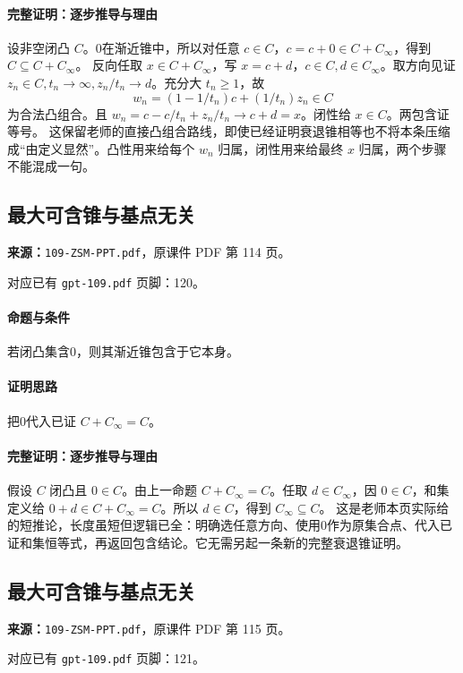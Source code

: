\paragraph{完整证明：逐步推导与理由}

设非空闭凸 $C$。0在渐近锥中，所以对任意 $c\in C$，$c=c+0\in C+C_\infty$，得到 $C\subseteq C+C_\infty$。
反向任取 $x\in C+C_\infty$，写 $x=c+d$，$c\in C,d\in C_\infty$。取方向见证 $z_n\in C,t_n\to\infty,z_n/t_n\to d$。充分大 $t_n\ge1$，故
\[w_n=(1-1/t_n)c+(1/t_n)z_n\in C\]
为合法凸组合。且 $w_n=c-c/t_n+z_n/t_n\to c+d=x$。闭性给 $x\in C$。两包含证等号。
这保留老师的直接凸组合路线，即使已经证明衰退锥相等也不将本条压缩成“由定义显然”。凸性用来给每个 $w_n$ 归属，闭性用来给最终 $x$ 归属，两个步骤不能混成一句。

\clearpage\subsection{最大可含锥与基点无关}
\textbf{来源：}\texttt{109-ZSM-PPT.pdf}，原课件 PDF 第 114 页。\par
对应已有 \texttt{gpt-109.pdf} 页脚：120。\par
\paragraph{命题与条件}若闭凸集含0，则其渐近锥包含于它本身。
\paragraph{证明思路}把0代入已证 $C+C_\infty=C$。
\paragraph{完整证明：逐步推导与理由}

假设 $C$ 闭凸且 $0\in C$。由上一命题 $C+C_\infty=C$。任取 $d\in C_\infty$，因 $0\in C$，和集定义给 $0+d\in C+C_\infty=C$。所以 $d\in C$，得到 $C_\infty\subseteq C$。
这是老师本页实际给的短推论，长度虽短但逻辑已全：明确选任意方向、使用0作为原集合点、代入已证和集恒等式，再返回包含结论。它无需另起一条新的完整衰退锥证明。

\clearpage\subsection{最大可含锥与基点无关}
\textbf{来源：}\texttt{109-ZSM-PPT.pdf}，原课件 PDF 第 115 页。\par
对应已有 \texttt{gpt-109.pdf} 页脚：121。\par
